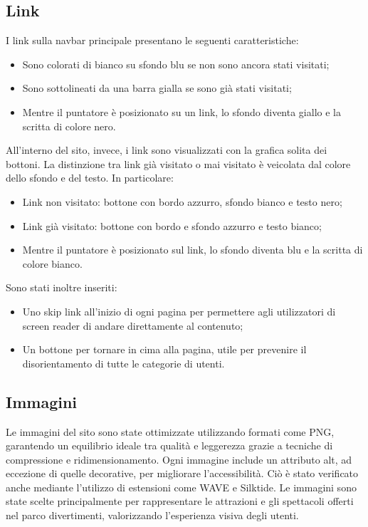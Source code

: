 \subsection{Link}
I link sulla navbar principale presentano le seguenti caratteristiche:
\begin{itemize}
    \item Sono colorati di bianco su sfondo blu se non sono ancora stati visitati;
    \item Sono sottolineati da una barra gialla se sono già stati visitati;
    \item Mentre il puntatore è posizionato su un link, lo sfondo diventa giallo e la scritta di colore nero.
\end{itemize}
All'interno del sito, invece, i link sono visualizzati con la grafica solita dei bottoni. La distinzione tra link già visitato o mai visitato è veicolata dal colore dello sfondo e del testo. In particolare:
\begin{itemize}
    \item Link non visitato: bottone con bordo azzurro, sfondo bianco e testo nero;
    \item Link già visitato: bottone con bordo e sfondo azzurro e testo bianco;
    \item Mentre il puntatore è posizionato sul link, lo sfondo diventa blu e la scritta di colore bianco.
\end{itemize}
Sono stati inoltre inseriti:
\begin{itemize}
    \item Uno skip link all'inizio di ogni pagina per permettere agli utilizzatori di screen reader di andare direttamente al contenuto;
    \item Un bottone per tornare in cima alla pagina, utile per prevenire il disorientamento di tutte le categorie di utenti.
\end{itemize}
\subsection{Immagini}
Le immagini del sito sono state ottimizzate utilizzando formati come PNG, garantendo un equilibrio ideale tra qualità e leggerezza grazie a tecniche di compressione e ridimensionamento. Ogni immagine include un attributo alt, ad eccezione di quelle decorative, per migliorare l’accessibilità. Ciò è stato verificato anche mediante l'utilizzo di estensioni come WAVE e Silktide. Le immagini sono state scelte principalmente per rappresentare le attrazioni e gli spettacoli offerti nel  parco divertimenti, valorizzando l’esperienza visiva degli utenti.

